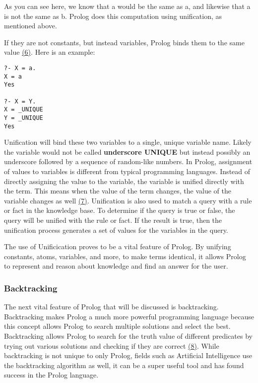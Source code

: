 \documentclass{article}
\theoremstyle{theorem}
\theoremstyle{definition}
\theoremstyle{remark}
\begin{document}
As you can see here, we know that a would be the same as a, and likewise that a is not the same as b. Prolog does this computation using unification, as mentioned above.

If they are not constants, but instead variables, Prolog binds them to the same value \href{https://www.dai.ed.ac.uk/groups/ssp/bookpages/quickprolog/node12.html}{(6)}. Here is an example:
\begin{verbatim}
?- X = a.
X = a
Yes

?- X = Y.
X = _UNIQUE
Y = _UNIQUE
Yes

\end{verbatim}

\noindent\newline Unification will bind these two variables to a single, unique variable name. Likely the variable would not be called \textbf{underscore UNIQUE} but instead possibly an underscore followed by a sequence of random-like numbers.  In Prolog, assignment of values to variables is different from typical programming languages. Instead of directly assigning the value to the variable, the variable is unified directly with the term. This means when the value of the term changes, the value of the variable changes as well \href{https://cliplab.org/~logalg/doc/The_Art_of_Prolog.pdf}{(7)}. Unification is also used to match a query with a rule or fact in the knowledge base. To determine if the query is true or false, the query will be unified with the rule or fact. If the result is true, then the unification process generates a set of values for the variables in the query. 

\noindent\newline The use of Unificication proves to be a vital feature of Prolog. By unifying constants, atoms, variables, and more, to make terms identical, it allows Prolog to represent and reason about knowledge and find an answer for the user.



\subsubsection{Backtracking}
\noindent\newline The next vital feature of Prolog that will be discussed is backtracking. Backtracking makes Prolog a much more powerful programming language because this concept allows Prolog to search multiple solutions and select the best. Backtracking allows Prolog to search for the truth value of different predicates by trying out various solutions and checking if they are correct \href{https://www.tutorialspoint.com/prolog/prolog_backtracking.htm#:~:text=Backtracking}{(8)}. While backtracking is not unique to only Prolog, fields such as Artificial Intelligence use the backtracking algorithm as well, it can be a super useful tool and has found success in the Prolog language.
\end{document}
